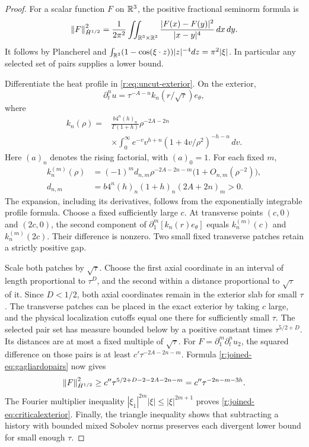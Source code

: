 \begin{proof}
For a scalar function $F$ on $\mathbb R^3$, the positive fractional seminorm formula is
\begin{equation}\label{r:joined-eq:gagliardopairs}
\left\lVert F\right\rVert_{\dot H^{1/2}}^2
=\frac1{2\pi^2}
\iint_{\mathbb R^3\times\mathbb R^3}
\frac{|F(x)-F(y)|^2}{|x-y|^4}\,dx\,dy .
\end{equation}
It follows by Plancherel and
$\int_{\mathbb R^3}(1-\cos(\xi\cdot z))|z|^{-4}dz=\pi^2|\xi|$.
In particular any selected set of pairs supplies a lower bound.

Differentiate the heat profile in \eqref{r:eq:uncut-exterior}. On the exterior,
\[
\partial_t^n u
=\tau^{-A-n}k_n(r/\sqrt\tau)e_\theta,
\]
where
\begin{equation*}
\begin{aligned}
k_n(\rho)
={}&\frac{b4^n(h)_n}{\Gamma(1+h)}
\rho^{-2A-2n}\\
&\times\int_0^\infty e^{-v}v^{h+n}
(1+4v/\rho^2)^{-h-n}\,dv .
\end{aligned}
\end{equation*}
Here $(a)_n$ denotes the rising factorial, with $(a)_0=1$. For each fixed $m$,
\[
\begin{aligned}
k_n^{(m)}(\rho)
&=(-1)^m d_{n,m}\rho^{-2A-2n-m}
\bigl(1+O_{n,m}(\rho^{-2})\bigr),\\
d_{n,m}&=b4^n(h)_n(1+h)_n(2A+2n)_m>0.
\end{aligned}
\]
The expansion, including its derivatives, follows from the exponentially integrable profile formula. Choose a fixed sufficiently large $c$. At transverse points $(c,0)$ and $(2c,0)$, the second component of
$\partial_1^m[k_n(r)e_\theta]$ equals $k_n^{(m)}(c)$ and $k_n^{(m)}(2c)$. Their difference is nonzero. Two small fixed transverse patches retain a strictly positive gap.

Scale both patches by $\sqrt\tau$. Choose the first axial coordinate in an interval of length proportional to $\tau^D$, and the second within a distance proportional to $\sqrt\tau$ of it. Since $D<1/2$, both axial coordinates remain in the exterior slab for small $\tau$. The transverse patches can be placed in the exact exterior by taking $c$ large, and the physical localization cutoffs equal one there for sufficiently small $\tau$. The selected pair set has measure bounded below by a positive constant times
$\tau^{5/2+D}$. Its distances are at most a fixed multiple of $\sqrt\tau$. For $F=\partial_1^m\partial_t^n u_2$, the squared difference on those pairs is at least
$c'\tau^{-2A-2n-m}$.
Formula \eqref{r:joined-eq:gagliardopairs} now gives
\[
\left\lVert F\right\rVert_{\dot H^{1/2}}^2
\ge c''\tau^{5/2+D-2-2A-2n-m}
=c''\tau^{-2n-m-3h}.
\]
The Fourier multiplier inequality
$|\xi_1|^{2m}|\xi|\le|\xi|^{2m+1}$
proves \eqref{r:joined-eq:criticalexterior}. Finally, the triangle inequality shows that subtracting a history with bounded mixed Sobolev norms preserves each divergent lower bound for small enough $\tau$.
\end{proof}

